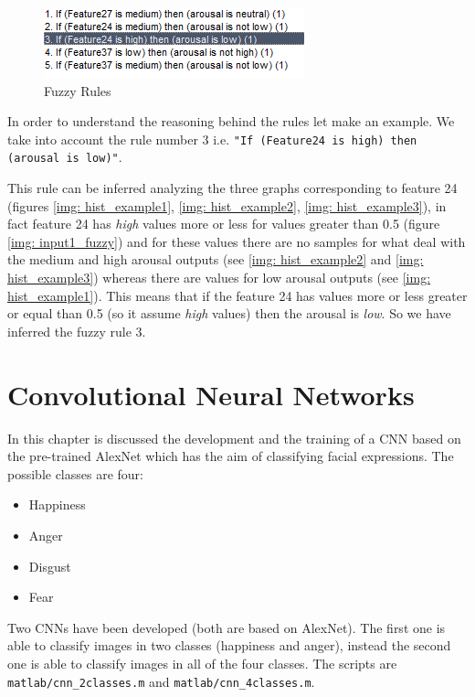 \documentclass[a4paper]{report}
\begin{document}
	\begin{figure}[htbp]
		\centering
		\includegraphics[scale=1.5]{img/onlyRules.png}
		\caption{Fuzzy Rules}
		\label{img: rules}
	\end{figure}

	\noindent In order to understand the reasoning behind the rules let make an example. We take into account the rule number 3 i.e. \texttt{"If (Feature24 is high) then (arousal is low)"}.
	
	\noindent This rule can be inferred analyzing the three graphs corresponding to feature 24 (figures \ref{img: hist_example1}, \ref{img: hist_example2}, \ref{img: hist_example3}), in fact feature 24 has \textit{high} values more or less for values greater than 0.5 (figure \ref{img: input1_fuzzy}) and for these values there are no samples for what deal with the medium and high arousal outputs (see \ref{img: hist_example2} and \ref{img: hist_example3}) whereas there are values for low arousal outputs (see \ref{img: hist_example1}). This means that if the feature 24 has values more or less greater or equal than 0.5 (so it assume \textit{high} values) then the arousal is \textit{low}. So we have inferred the fuzzy rule 3.
	
	
	
	
\chapter{Convolutional Neural Networks}
\label{chap: CNN}
	\noindent In this chapter is discussed the development and the training of a CNN based on the pre-trained AlexNet which has the aim of classifying facial expressions. The possible classes are four:
	\begin{itemize}
		\item Happiness
		\item Anger
		\item Disgust
		\item Fear
	\end{itemize} 
	\noindent Two CNNs have been developed (both are based on AlexNet). The first one is able to classify images in two classes (happiness and anger), instead the second one is able to classify images in all of the four classes. The scripts are \texttt{matlab/cnn\_2classes.m} and \texttt{matlab/cnn\_4classes.m}. 
	
\end{document}
